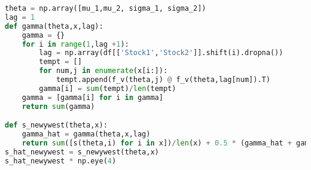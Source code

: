\begin{enumerate}[(a)]
\begin{lstlisting}[language=Python, caption=Python function for calculating Newy-West standard error , label={lst:q1a}, escapechar=|, frame=single, basicstyle=\small, showstringspaces=false, captionpos=b, breaklines=true, showspaces=false, showtabs=false, keywordstyle=\color{blue}, commentstyle=\color{gray}]
theta = np.array([mu_1,mu_2, sigma_1, sigma_2])
lag = 1
def gamma(theta,x,lag):
    gamma = {}
    for i in range(1,lag +1):
        lag = np.array(df[['Stock1','Stock2']].shift(i).dropna())
        tempt = []
        for num,j in enumerate(x[i:]):
            tempt.append(f_v(theta,j) @ f_v(theta,lag[num]).T)
        gamma[i] = sum(tempt)/len(tempt)
    gamma = [gamma[i] for i in gamma]
    return sum(gamma)

def s_newywest(theta,x):
    gamma_hat = gamma(theta,x,lag)
    return sum([s(theta,i) for i in x])/len(x) + 0.5 * (gamma_hat + gamma_hat.T)
s_hat_newywest = s_newywest(theta,x)
s_hat_newywest * np.eye(4)
\end{lstlisting}


\end{enumerate}
